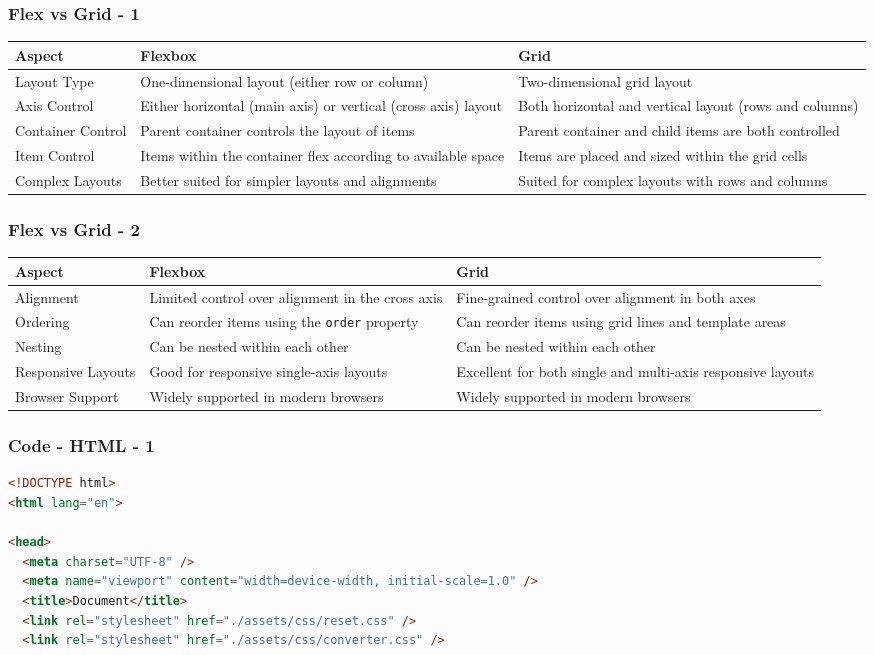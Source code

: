 \documentclass[aspectratio=169, table]{beamer}
\begin{document}
\begin{frame}
    \frametitle{Flex vs Grid - 1}
    \vskip1cm
   \begin{tabular}{p{3cm} p{5cm} p{5cm}}
	    \toprule
	    \textbf{Aspect} & \textbf{Flexbox} & \textbf{Grid} \\
	    \midrule
	    Layout Type & One-dimensional layout (either row or column) & Two-dimensional grid layout \\
	    Axis Control & Either horizontal (main axis) or vertical (cross axis) layout & Both horizontal and vertical layout (rows and columns) \\
	    Container Control & Parent container controls the layout of items & Parent container and child items are both controlled \\
	    Item Control & Items within the container flex according to available space & Items are placed and sized within the grid cells \\
	    Complex Layouts & Better suited for simpler layouts and alignments & Suited for complex layouts with rows and columns \\
	    \bottomrule
	\end{tabular}
\end{frame}

\begin{frame}
    \frametitle{Flex vs Grid - 2}
    \vskip1cm
   \begin{tabular}{p{3cm} p{5cm} p{5cm}}
	    \toprule
	    \textbf{Aspect} & \textbf{Flexbox} & \textbf{Grid} \\
	    \midrule
	    Alignment & Limited control over alignment in the cross axis & Fine-grained control over alignment in both axes \\
	    Ordering & Can reorder items using the \texttt{order} property & Can reorder items using grid lines and template areas \\
	    Nesting & Can be nested within each other & Can be nested within each other \\
	    Responsive Layouts & Good for responsive single-axis layouts & Excellent for both single and multi-axis responsive layouts \\
	    Browser Support & Widely supported in modern browsers & Widely supported in modern browsers \\
	    \bottomrule
	\end{tabular}
\end{frame}


\begin{frame}[fragile]
    \frametitle{Code - HTML - 1}
    \vskip1cm
    \begin{lstlisting}[language=HTML]
<!DOCTYPE html>
<html lang="en">

<head>
  <meta charset="UTF-8" />
  <meta name="viewport" content="width=device-width, initial-scale=1.0" />
  <title>Document</title>
  <link rel="stylesheet" href="./assets/css/reset.css" />
  <link rel="stylesheet" href="./assets/css/converter.css" />
    \end{lstlisting}
\end{frame}
\end{document}
